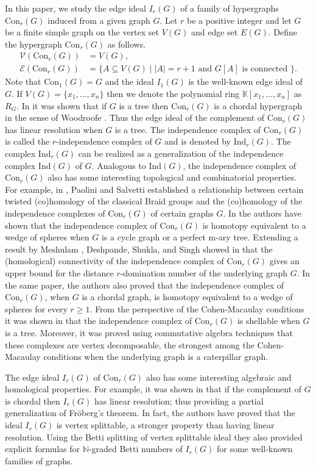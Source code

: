 \documentclass[12pt,reqno]{amsart}
\theoremstyle{definition}
\newcommand{\N}{\mathbb N}
\def\V{\mathcal{V}}
\def\E{\mathcal{E}}
\def\C{\mathrm{Con}_r(G)}
\begin{document}
In this paper, we study the edge ideal $I_r(G)$ of a family of hypergraphs $\C$ induced from a given graph $G$. Let $r$ be a positive integer and let $G$ be a finite simple graph on the vertex set $V(G)$ and edge set $E(G)$. Define the hypergraph $\mathrm{Con}_r(G)$ as follows.
\begin{align*}
    \V(\mathrm{Con}_r(G))&=V(G),\\
    \E(\mathrm{Con}_r(G))&=\{A\subseteq V(G)\mid |A|=r+1\text{ and }G[A]\text{ is connected }\}.
\end{align*}
Note that $\mathrm{Con}_1(G)=G$ and the ideal $I_1(G)$ is the well-known edge ideal of $G$. If $V(G)=\{x_1,\ldots,x_n\}$ then we denote the polynomial ring $\mathbb K[x_1,\ldots,x_n]$ as $R_G$. In \cite{ADGRS} it was shown that if $G$ is a tree then $\C$ is a chordal hypergraph in the sense of Woodroofe \cite{Woodroofe}. Thus the edge ideal of the complement of $\C$ has linear resolution when $G$ is a tree. The independence complex of $\C$ is called the $r$-independence complex of $G$ and is denoted by $\mathrm{Ind}_r(G)$. The complex $\mathrm{Ind}_r(G)$ can be realized as a generalization of the independence complex $\mathrm{Ind}(G)$ of $G$. Analogous to $\mathrm{Ind}(G)$, the independence complex of $\C$ also has some interesting topological and combinatorial properties. For example, in \cite{PS}, Paolini and Salvetti established a relationship between certain twisted (co)homology of the classical Braid groups and the (co)homology of the independence complexes of $\C$ of certain graphs $G$. In \cite{DS} the authors have shown that the independence complex of $\C$ is homotopy equivalent to a wedge of spheres when $G$ is a cycle graph or a perfect m-ary tree. Extending a result by Meshulam \cite{Meshulam}, Deshpande, Shukla, and Singh showed in \cite{DSS} that the (homological) connectivity of the independence complex of $\C$ gives an upper bound for the distance $r$-domination number of the underlying graph $G$. In the same paper, the authors also proved that the independence complex of $\C$, when $G$ is a chordal graph, is homotopy equivalent to a wedge of spheres for every $r\ge 1$. 
From the perspective of the Cohen-Macaulay conditions it was shown in \cite{ADGRS} that the independence complex of $\C$ is shellable when $G$ is a tree.  Moreover, it was proved using commutative algebra techniques that these complexes are vertex decomposable, the strongest among the Cohen-Macaulay conditions when the underlying graph is a caterpillar graph.

The edge ideal $I_r(G)$ of $\C$ also has some interesting algebraic and homological properties. For example, it was shown in \cite{DRST} that if the complement of $G$ is chordal then $I_r(G)$ has linear resolution; thus providing a partial generalization of Fr\"oberg's theorem. In fact, the authors have proved that the ideal $I_r(G)$ is vertex splittable, a stronger property than having linear resolution. Using the Betti splitting of vertex splittable ideal they also provided explicit formulas for $\N$-graded Betti numbers of $I_r(G)$ for some well-known families of graphs.
\end{document}

